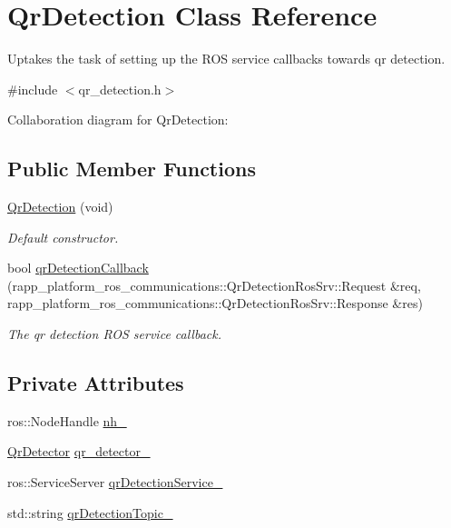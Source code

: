 \hypertarget{classQrDetection}{\section{Qr\-Detection Class Reference}
\label{classQrDetection}
}


Uptakes the task of setting up the R\-O\-S service callbacks towards qr detection.  




{\ttfamily \#include $<$qr\-\_\-detection.\-h$>$}



Collaboration diagram for Qr\-Detection\-:
\subsection*{Public Member Functions}
\begin{DoxyCompactItemize}
\item 
\hyperlink{classQrDetection_a97890b1548487ff8660924821a7e0e1f}{Qr\-Detection} (void)
\begin{DoxyCompactList}\small\item\em Default constructor. \end{DoxyCompactList}\item 
bool \hyperlink{classQrDetection_a9e81b97a3acc36caa03c2241d649704b}{qr\-Detection\-Callback} (rapp\-\_\-platform\-\_\-ros\-\_\-communications\-::\-Qr\-Detection\-Ros\-Srv\-::\-Request \&req, rapp\-\_\-platform\-\_\-ros\-\_\-communications\-::\-Qr\-Detection\-Ros\-Srv\-::\-Response \&res)
\begin{DoxyCompactList}\small\item\em The qr detection R\-O\-S service callback. \end{DoxyCompactList}\end{DoxyCompactItemize}
\subsection*{Private Attributes}
\begin{DoxyCompactItemize}
\item 
ros\-::\-Node\-Handle \hyperlink{classQrDetection_ab99255e948da428610958e3da45cc692}{nh\-\_\-}
\item 
\hyperlink{classQrDetector}{Qr\-Detector} \hyperlink{classQrDetection_a5417be9d21d01ff82067b022bfd613fe}{qr\-\_\-detector\-\_\-}
\item 
ros\-::\-Service\-Server \hyperlink{classQrDetection_a9785dc6824ccc757d5ba8c22d478b271}{qr\-Detection\-Service\-\_\-}
\item 
std\-::string \hyperlink{classQrDetection_acbf716f43bb9af5cb95cd0289f07269d}{qr\-Detection\-Topic\-\_\-}
\end{DoxyCompactItemize}


